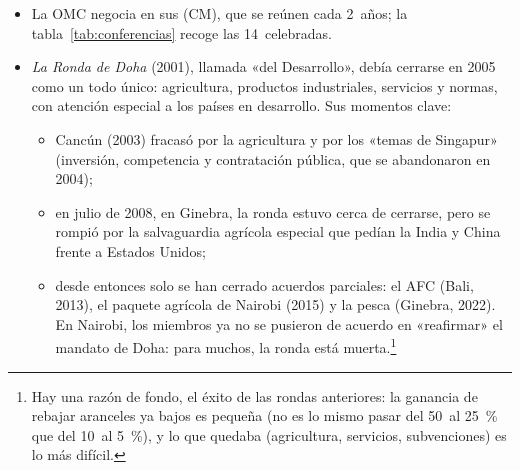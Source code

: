 \documentclass[11pt]{article}
\begin{document}
\begin{itemize}
\item La OMC negocia en sus  (CM), que se reúnen cada 2~años; la tabla~\ref{tab:conferencias} recoge las 14~celebradas.
\item \emph{La Ronda de Doha} (2001), llamada «del Desarrollo», debía cerrarse en 2005 como un todo único: agricultura, productos industriales, servicios y normas, con atención especial a los países en desarrollo. Sus momentos clave:
  \begin{itemize}
  \item Cancún (2003) fracasó por la agricultura y por los «temas de Singapur» (inversión, competencia y contratación pública, que se abandonaron en 2004);
  \item en julio de 2008, en Ginebra, la ronda estuvo cerca de cerrarse, pero se rompió por la salvaguardia agrícola especial que pedían la India y China frente a Estados Unidos;
  \item desde entonces solo se han cerrado acuerdos parciales: el AFC (Bali, 2013), el paquete agrícola de Nairobi (2015) y la pesca (Ginebra, 2022). En Nairobi, los miembros ya no se pusieron de acuerdo en «reafirmar» el mandato de Doha: para muchos, la ronda está muerta.\footnote{Hay una razón de fondo, el éxito de las rondas anteriores: la ganancia de rebajar aranceles ya bajos es pequeña (no es lo mismo pasar del 50~al 25~\% que del 10~al 5~\%), y lo que quedaba (agricultura, servicios, subvenciones) es lo más difícil.}
  \end{itemize}
\end{itemize}
\end{document}
